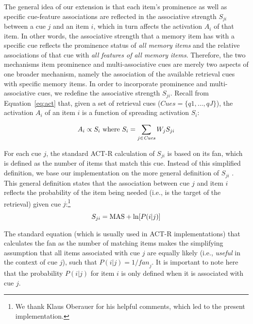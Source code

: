 \documentclass{cambridge7A}\usepackage[]{graphicx}\usepackage[]{color}
\begin{document}
The general idea of our extension is that each item's prominence as well as specific cue-feature associations are reflected in the associative strength $S_{ji}$ between a cue $j$ and an item $i$, which in turn affects the activation $A_i$ of that item.
In other words, the associative strength that a memory item has with a specific cue reflects the prominence status of \emph{all memory items} and the relative associations of that cue with \emph{all features of all memory items}.
Therefore, the two mechanisms item prominence and multi-associative cues are merely two aspects of one broader mechanism, namely the association of the available retrieval cues with specific memory items.
In order to incorporate prominence and multi-associative cues, we redefine the associative strength $S_{ji}$.
Recall from Equation~\ref{eq:act} that, given a set of retrieval cues ($\textit{Cues} = \{q1,\dots,qJ\}$), the activation $A_i$ of an item $i$ is a function of spreading activation $S_i$:

\begin{equation}
A_i \propto S_i \hbox{ where } S_i = \sum\limits_{j \in \textit{Cues}} W_j S_{ji}
\end{equation}

  
For each cue $j$, the standard ACT-R calculation of $S_{ji}$ is based on its fan, which is defined as the number of items that match this cue. 
Instead of this simplified definition, we base our implementation on the more general definition of $S_{ji}$ \citep[p.\ 129]{SchneiderAnderson2012}. This general definition states that the association between cue $j$ and item $i$ reflects the probability of the item being needed (i.e., is the target of the retrieval) given cue $j$:\footnote{We thank Klaus Oberauer for his helpful comments, which led to the present implementation.}
\begin{equation}
	S_{ji} = \hbox{MAS} + \hbox{ln}[P(i|j)]
\end{equation}

The standard equation (which is usually used in ACT-R implementations) that calculates the fan as the number of matching items makes the simplifying assumption that all items associated with cue $j$ are equally likely (i.e., \textit{useful} in the context of cue $j$), such that $P(i|j) = 1/\textit{fan}_j$. It is important to note here that the probability $P(i|j)$ for item $i$ is only defined when it is associated with cue $j$.

% 
% 
\end{document}
